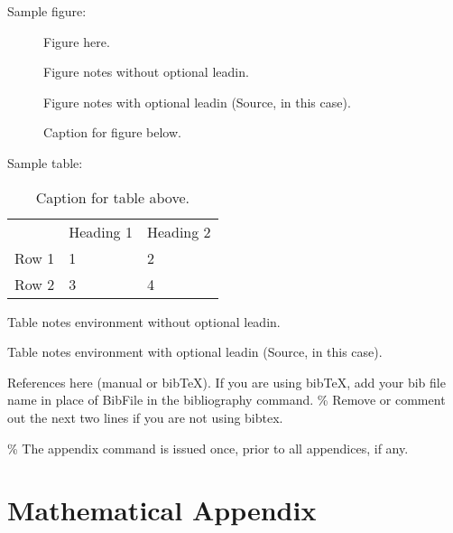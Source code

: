\documentclass[]{AEA}
\begin{document}
Sample figure:

\begin{figure}
Figure here.

\caption{Caption for figure below.}
\begin{figurenotes}
Figure notes without optional leadin.
\end{figurenotes}
\begin{figurenotes}[Source]
Figure notes with optional leadin (Source, in this case).
\end{figurenotes}
\end{figure}

Sample table:

\begin{table}
\caption{Caption for table above.}

\begin{tabular}{lll}
& Heading 1 & Heading 2 \\
Row 1 & 1 & 2 \\
Row 2 & 3 & 4%
\end{tabular}
\begin{tablenotes}
Table notes environment without optional leadin.
\end{tablenotes}
\begin{tablenotes}[Source]
Table notes environment with optional leadin (Source, in this case).
\end{tablenotes}
\end{table}

References here (manual or bibTeX). If you are using bibTeX, add your
bib file name in place of BibFile in the bibliography command. \% Remove
or comment out the next two lines if you are not using bibtex.




\% The appendix command is issued once, prior to all appendices, if any.
\appendix

\section{Mathematical Appendix}
\end{document}
